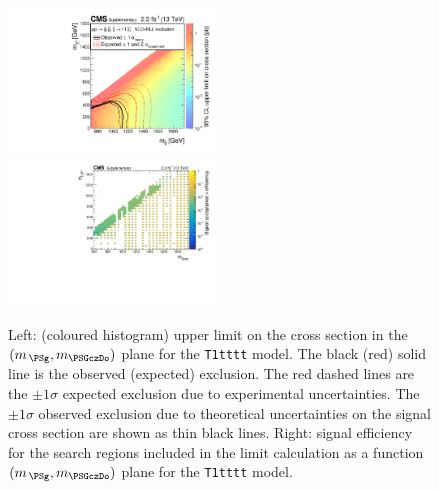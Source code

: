 \clearpage
\begin{figure}[!h]
  \begin{center}
    \includegraphics[width=0.49\textwidth]{RA1T1ttttXSEC_aux} \, 
    \includegraphics[width=0.49\textwidth]{T1tttt_merging_4_cats_aux} \,     
  \end{center}
  \caption{Left: (coloured histogram) upper limit on the cross section in the $(m_{\,\PSg}, m_{\PSGczDo})$ plane for the \texttt{T1tttt} model. 
  The black (red) solid line is the observed (expected) exclusion. The red dashed lines are the $\pm1\sigma$ expected exclusion due to experimental uncertainties. 
  The $\pm1\sigma$ observed exclusion due to theoretical uncertainties on the signal cross section are shown as thin black lines. 
  Right: signal efficiency for the search regions included in the limit calculation as a function $(m_{\,\PSg}, m_{\PSGczDo})$ plane for the \texttt{T1tttt} model. 
  \label{fig:T1tttt_excl}}
\end{figure}

